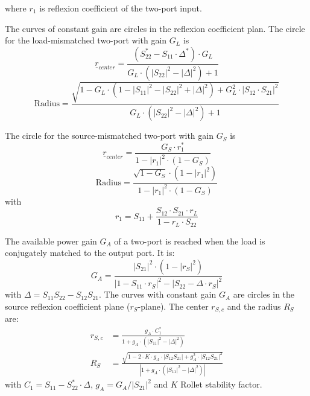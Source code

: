 where $r_1$ is reflexion coefficient of the two-port input.

\addvspace{12pt}

The curves of constant gain are circles in the reflexion coefficient
plan.  The circle for the load-mismatched two-port with gain $G_L$ is
\begin{equation}
\underline{r}_{center} = \frac{(S_{22}^* - S_{11}\cdot \Delta^*) \cdot G_L}{G_L\cdot (|S_{22}|^2 - |\Delta|^2) + 1}
\end{equation}
\begin{equation}
\text{Radius} =
   \frac{\sqrt{1 - G_L\cdot (1-|S_{11}|^2-|S_{22}|^2+|\Delta|^2) + G_L^2\cdot |S_{12}\cdot S_{21}|^2}}
        {G_L\cdot (|S_{22}|^2 - |\Delta|^2) + 1}
\end{equation}

The circle for the source-mismatched two-port with gain $G_S$ is
\begin{equation}
\underline{r}_{center} = \frac{G_S\cdot r_1^*}{1 - |r_1|^2\cdot (1-G_S)}
\end{equation}
\begin{equation}
\text{Radius} =
   \frac{\sqrt{1 - G_S}\cdot (1-|r_1|^2)}{1 - |r_1|^2\cdot (1-G_S)}
\end{equation}
with
\begin{equation}
r_1 = S_{11} + \frac{S_{12}\cdot S_{21}\cdot r_L}{1 - r_L\cdot S_{22}}
\end{equation}

\addvspace{12pt}

The available power gain $G_A$ of a two-port is reached when the load is
conjugately matched to the output port. It is:
\begin{equation}
G_A = \frac{|S_{21}|^2\cdot (1-|r_S|^2)}{|1-S_{11}\cdot r_S|^2 - |S_{22}-\Delta\cdot r_S|^2}
\end{equation}
with $\Delta = S_{11}S_{22} - S_{12}S_{21}$. The curves with constant
gain $G_A$ are circles in the source reflexion coefficient plane ($r_S$-plane).
The center $r_{S,c}$ and the radius $R_S$ are:
\begin{align}
r_{S,c} & = \frac{g_A\cdot C_1^*}{1 + g_A\cdot(|S_{11}|^2 - |\Delta|^2)} \\
R_S     & = \frac{\sqrt{1 - 2\cdot K\cdot g_A\cdot|S_{12}S_{21}| + g_A^2\cdot|S_{12}S_{21}|^2}}
                 {|1 + g_A\cdot(|S_{11}|^2 - |\Delta|^2)|}
\end{align}
with $C_1 = S_{11} - S_{22}^*\cdot\Delta$, $g_A = G_A / |S_{21}|^2$ and $K$ Rollet stability factor.

